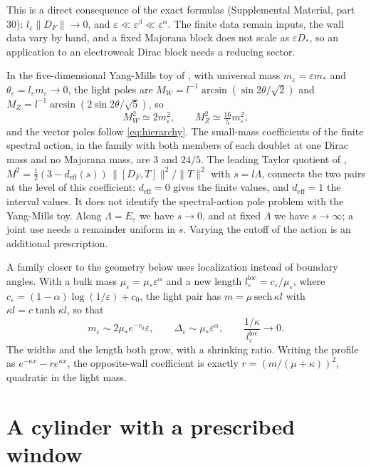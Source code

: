 \documentclass[aps,prd,reprint,onecolumn,nofootinbib,amsmath,amssymb,floatfix]{revtex4-2}
\theoremstyle{plain}
\newcommand{\supp}[1]{Supplemental Material, part #1}
\begin{document}
This is a direct consequence of the exact formulas (\supp{30}): $l_\varepsilon\|D_F\|\to0$, and $\varepsilon\ll\varepsilon^\beta\ll\varepsilon^\alpha$. The finite data remain inputs, the wall data vary by hand, and a fixed Majorana block does not scale as $\varepsilon D_*$, so an application to an electroweak Dirac block needs a reducing sector.

In the five-dimensional Yang-Mills toy of \cite{boundarynote}, with universal mass $m_\varepsilon=\varepsilon m_*$ and $\theta_\varepsilon=l_\varepsilon m_\varepsilon\to0$, the light poles are $M_W=l^{-1}\arcsin(\sin2\theta/\sqrt2)$ and $M_Z=l^{-1}\arcsin(2\sin2\theta/\sqrt5)$, so
\begin{equation}
M_W^2\simeq2m_\varepsilon^2,\qquad M_Z^2\simeq\tfrac{16}{5}m_\varepsilon^2,
\end{equation}
and the vector poles follow \eqref{eq:hierarchy}. The small-mass coefficients of the finite spectral action, in the family with both members of each doublet at one Dirac mass and no Majorana mass, are $3$ and $24/5$. The leading Taylor quotient of \cite{boundarynote}, $M^2=\tfrac12(3-d_{\mathrm{eff}}(s))\,\|[D_F,T]\|^2/\|T\|^2$ with $s=l\Lambda$, connects the two pairs at the level of this coefficient: $d_{\mathrm{eff}}=0$ gives the finite values, and $d_{\mathrm{eff}}=1$ the interval values. It does not identify the spectral-action pole problem with the Yang-Mills toy. Along $\Lambda=E_\varepsilon$ we have $s\to0$, and at fixed $\Lambda$ we have $s\to\infty$; a joint use needs a remainder uniform in $s$. Varying the cutoff of the action is an additional prescription.

A family closer to the geometry below uses localization instead of boundary angles. With a bulk mass $\mu_\varepsilon=\mu_*\varepsilon^\alpha$ and a new length $l^{\mathrm{loc}}_\varepsilon=c_\varepsilon/\mu_\varepsilon$, where $c_\varepsilon=(1-\alpha)\log(1/\varepsilon)+c_0$, the light pair has $m=\mu\,\mathrm{sech}\,\kappa l$ with $\kappa l=c\tanh\kappa l$, so that
\begin{equation}
m_\varepsilon\sim2\mu_*e^{-c_0}\varepsilon,\qquad\Delta_\varepsilon\sim\mu_*\varepsilon^\alpha,\qquad\frac{1/\kappa}{l^{\mathrm{loc}}_\varepsilon}\to0.
\end{equation}
The widths and the length both grow, with a shrinking ratio. Writing the profile as $e^{-\kappa x}-re^{\kappa x}$, the opposite-wall coefficient is exactly $r=(m/(\mu+\kappa))^2$, quadratic in the light mass.

\section{A cylinder with a prescribed window}\label{sec:cylinder}
\end{document}

